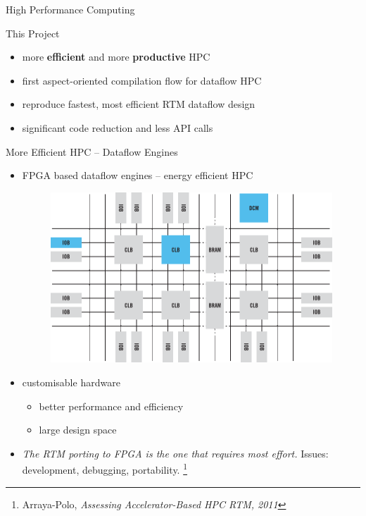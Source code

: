\begin{frame}{High Performance Computing}
  \begin{beamerboxesrounded}{This Project}
    \begin{itemize}
    \item more \textbf{efficient} and more \textbf{productive} HPC
    \item first aspect-oriented compilation flow for dataflow HPC
    \item reproduce fastest, most efficient RTM dataflow design
    \item significant code reduction and less API calls
    \end{itemize}
  \end{beamerboxesrounded}
\end{frame}


\begin{frame}{More Efficient HPC -- Dataflow Engines}
\begin{itemize}
  \item FPGA based dataflow engines -- energy efficient HPC
 \begin{figure}[!ht]
   \includegraphics[scale=0.3, clip=true, trim=0 270 295 110]{figs/fpga-block-structure.png}
  \end{figure}
\hspace{0.25cm}
\item customisable hardware
  \begin{itemize}
  \item better performance and efficiency
  \item large design space
  \end{itemize}
\hspace{0.25cm}

\item \emph{The RTM porting to FPGA is the one that requires most
    effort.} Issues: development, debugging, portability. \footnote{Arraya-Polo, \emph{Assessing Accelerator-Based
HPC RTM, 2011}
}
\end{itemize}
\end{frame}

